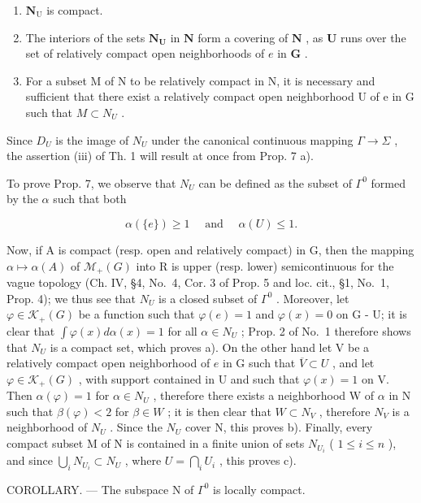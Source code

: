 \begin{enumerate}
\def\labelenumi{\alph{enumi})}
\item
  \(\mathbf{N}_{\mathrm{U}}\) is compact.
\item
  The interiors of the sets \(\mathbf{N}_{\mathbf{U}}\) in \(\mathbf{N}\) form a covering of \(\mathbf{N}\) , as \(\mathbf{U}\) runs over the set of relatively compact open neighborhoods of \(e\) in \(\mathbf{G}\) .
\item
  For a subset M of N to be relatively compact in N, it is necessary and sufficient that there exist a relatively compact open neighborhood U of e in G such that \(M \subset N_{U}\) .
\end{enumerate}

Since \(D_{U}\) is the image of \(N_{U}\) under the canonical continuous mapping \(\Gamma \rightarrow \Sigma\) , the assertion (iii) of Th. 1 will result at once from Prop. 7 a).

To prove Prop. 7, we observe that \(N_{U}\) can be defined as the subset of \(\Gamma^{0}\) formed by the \(\alpha\) such that both

\[
\alpha (\{e \}) \geqslant 1 \quad \text { and } \quad \alpha (U) \leqslant 1.
\]

Now, if A is compact (resp. open and relatively compact) in G, then the mapping \(\alpha \mapsto \alpha(A)\) of \(\mathcal{M}_{+}(G)\) into R is upper (resp. lower) semicontinuous for the vague topology (Ch. IV, §4, No.~4, Cor. 3 of Prop. 5 and loc. cit., §1, No.~1, Prop. 4); we thus see that \(N_{U}\) is a closed subset of \(\Gamma^{0}\) . Moreover, let \(\varphi \in \mathcal{K}_{+}(G)\) be a function such that \(\varphi(e) = 1\) and \(\varphi(x) = 0\) on G - U; it is clear that \(\int \varphi(x)d\alpha(x) = 1\) for all \(\alpha \in N_{U}\) ; Prop. 2 of No.~1 therefore shows that \(N_{U}\) is a compact set, which proves a). On the other hand let V be a relatively compact open neighborhood of \(e\) in G such that \(\overline{V} \subset U\) , and let \(\varphi \in \mathcal{K}_{+}(G)\) , with support contained in U and such that \(\varphi(x) = 1\) on V. Then \(\alpha(\varphi) = 1\) for \(\alpha \in N_{U}\) , therefore there exists a neighborhood W of \(\alpha\) in N such that \(\beta(\varphi) < 2\) for \(\beta \in W\) ; it is then clear that \(W \subset N_{V}\) , therefore \(N_{V}\) is a neighborhood of \(N_{U}\) . Since the \(N_{U}\) cover N, this proves b). Finally, every compact subset M of N is contained in a finite union of sets \(N_{U_i}\) ( \(1 \leqslant i \leqslant n\) ), and since \(\bigcup_{i} N_{U_i} \subset N_{U}\) , where \(U = \bigcap_{i} U_i\) , this proves c).

COROLLARY. --- The subspace N of \(\Gamma^0\) is locally compact.
\relax{}
